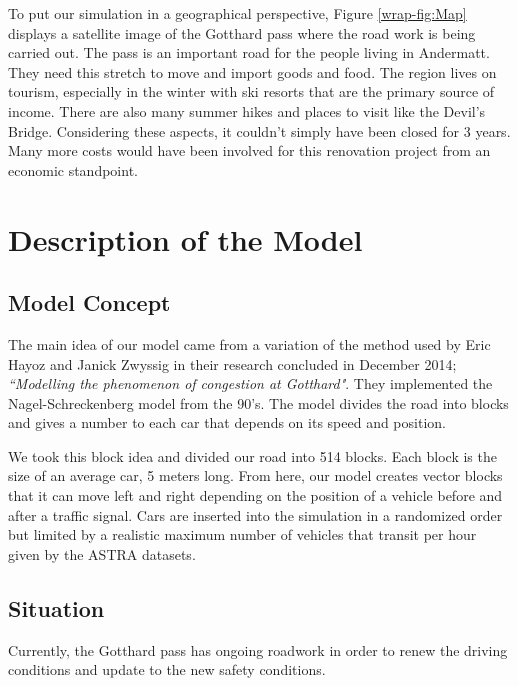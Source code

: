 \documentclass[11pt,a4paper,parskip=half-]{article}
\begin{document}
To put our simulation in a geographical perspective, Figure \ref{wrap-fig:Map} displays a satellite image of the Gotthard pass where the road work is being carried out. The pass is an important road for the people living in Andermatt. They need this stretch to move and import goods and food. The region lives on tourism, especially in the winter with ski resorts that are the primary source of income. There are also many summer hikes and places to visit like the Devil's Bridge. Considering these aspects, it couldn't simply have been closed for 3 years. Many more costs would have been involved for this renovation project from an economic standpoint. 


\vspace{3cm}







\section{Description of the Model}

\subsection{Model Concept}

The main idea of our model came from a variation of the method used by Eric Hayoz and Janick Zwyssig in their research concluded in December 2014; \textit{``Modelling the phenomenon of congestion at Gotthard"}. They implemented the Nagel-Schreckenberg model from the 90's. The model divides the road into blocks and gives a number to each car that depends on its speed and position. 

We took this block idea and divided our road into 514 blocks. Each block is the size of an average car, 5 meters long. From here, our model creates vector blocks that it can move left and right depending on the position of a vehicle before and after a traffic signal. Cars are inserted into the simulation in a randomized order but limited by a realistic maximum number of vehicles that transit per hour given by the ASTRA datasets. 



\subsection{Situation}
Currently, the Gotthard pass has ongoing roadwork in order to renew the driving conditions and update to the new safety conditions.
\end{document}
